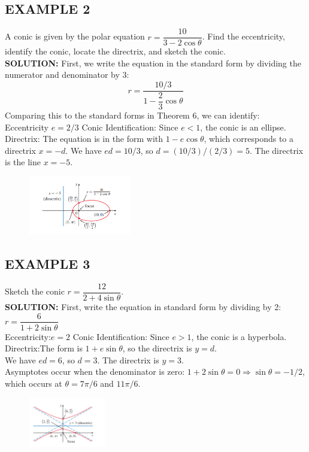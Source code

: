 \documentclass{article}
\begin{document}
\subsection*{EXAMPLE 2}
A conic is given by the polar equation $r = \dfrac{10}{3 - 2 \cos\theta}$. Find the eccentricity, identify the conic, locate the directrix, and sketch the conic.\\
\textbf{SOLUTION:}
First, we write the equation in the standard form by dividing the numerator and denominator by 3:
\[
r = \dfrac{10/3}{1 - \dfrac{2}{3} \cos\theta}
\]
Comparing this to the standard forms in Theorem 6, we can identify:\\
Eccentricity $e = 2/3$ Conic Identification: Since $e < 1$, the conic is an ellipse.\\
Directrix: The equation is in the form with $1 - e \cos\theta$, which corresponds to a directrix $x = -d$. We have $ed = 10/3$, so $d = (10/3) / (2/3) = 5$. The directrix is the line $x = -5$.
\begin{figure}[htbp]
    \centering
    \includegraphics[width=0.4\textwidth]{graph62.png}
\end{figure}

\subsection*{EXAMPLE 3}
Sketch the conic $r = \dfrac{12}{2 + 4 \sin\theta}$.\\
\textbf{SOLUTION:}
First, write the equation in standard form by dividing by 2:
$r = \dfrac{6}{1 + 2 \sin\theta}$\\
Eccentricity:$e = 2$ Conic Identification: Since $e > 1$, the conic is a hyperbola.\\
Directrix:The form is $1 + e \sin\theta$, so the directrix is $y = d$.\\
We have $ed = 6$, so $d = 3$. The directrix is $y = 3$.\\
Asymptotes occur when the denominator is zero: $1 + 2 \sin\theta = 0 \Rightarrow \sin\theta = -1/2$, which occurs at $\theta = 7\pi/6$ and $11\pi/6$.
\begin{figure}[htbp]
    \centering
    \includegraphics[width=0.3\textwidth]{graph63.png}
\end{figure}
\end{document}
